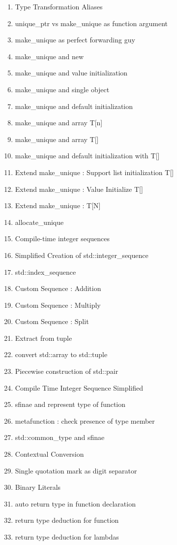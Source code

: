 \begin{enumerate}[noitemsep]
\item Type Transformation Aliases
\item unique\_ptr vs make\_unique as function argument
\item make\_unique as perfect forwarding guy
\item make\_unique and new
\item make\_unique and value initialization
\item make\_unique and single object
\item make\_unique and default initialization
\item make\_unique and array T[n]
\item make\_unique and array T[]
\item make\_unique and default initialization with T[]
 \item Extend make\_unique : Support list initialization T[]
\item Extend make\_unique : Value Initialize T[]
\item Extend make\_unique : T[N]
\item allocate\_unique
\item Compile-time integer sequences
\item Simplified Creation of std::integer\_sequence
\item std::index\_sequence
\item Custom Sequence : Addition
\item Custom Sequence : Multiply
\item Custom Sequence : Split
\item Extract from tuple
\item convert std::array to std::tuple
 \item Piecewise construction of std::pair
 \item Compile Time Integer Sequence Simplified
 \item sfinae and represent type of function
 \item metafunction : check presence of type member
 \item std::common\_type and sfinae
 \item Contextual Conversion
 \item Single quotation mark as digit separator
 \item Binary Literals
 \item auto return type in function declaration
 \item return type deduction for function
 \item return type deduction for lambdas

\end{enumerate}
